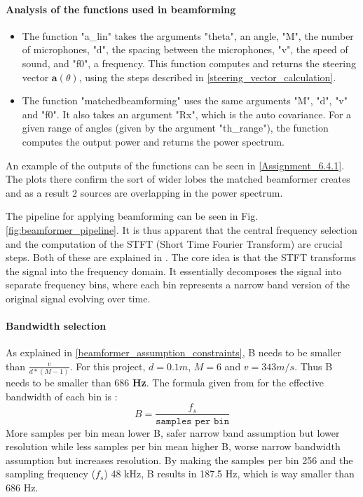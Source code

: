 \paragraph{Analysis of the functions used in beamforming}
\label{beam_funcs}
\begin{itemize}
    \item The function "a\_lin" takes the arguments "theta", an angle, "M", the number of microphones, "d", the spacing between the microphones, "v", the speed of sound, and "f0", a frequency. This function computes and returns the steering vector $\mathbf{a}(\theta)$, using the steps described in \ref{steering_vector_calculation}.

    \item The function "matchedbeamforming" uses the same arguments "M", "d", "v" and "f0". It also takes an argument "Rx", which is the auto covariance. For a given range of angles (given by the argument "th\_range"), the function computes the output power and returns the power spectrum.
\end{itemize}

An example of the outputs of the functions can be seen in \ref{Assignment_6.4.1}. The plots there confirm the sort of wider lobes the matched beamformer creates and as a result 2 sources are overlapping in the power spectrum.

The pipeline for applying beamforming can be seen in Fig. \ref{fig:beamformer_pipeline}. It is thus apparent that the central frequency selection and the computation of the STFT (Short Time Fourier Transform) are crucial steps. Both of these are explained in \cite{IP3Man}. The core idea is that the STFT transforms the signal into the frequency domain. It essentially decomposes the signal into separate frequency bins, where each bin represents a narrow band version of the original signal evolving over time. 

\paragraph{Bandwidth selection}
As explained in \ref{beamformer_assumption_constraints}, B needs to be smaller than $\frac{v}{d*(M - 1)}$. For this project, $d = 0.1 m$, $M = 6$ and $v = 343 m/s$. Thus B needs to be smaller than 686 \textbf{Hz}.
The formula given from \cite{IP3Man} for the effective bandwidth of each bin is : \begin{equation}
    B = \frac{f_s}{\texttt{samples per bin}}
\end{equation}
More samples per bin mean lower B, safer narrow band assumption but lower resolution while less samples per bin mean higher B, worse narrow bandwidth assumption but increases resolution.
By making the samples per bin 256 and the sampling frequency ($f_s$) 48 kHz, B results in 187.5 Hz, which is way smaller than 686 Hz.

